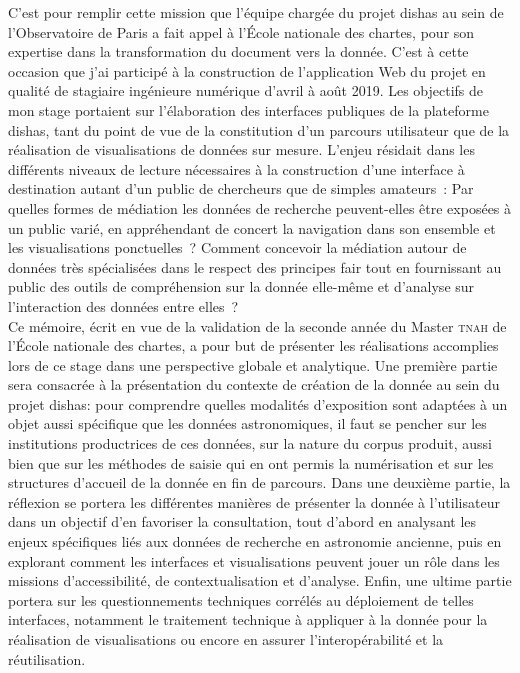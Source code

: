 \documentclass[a4paper,12pt,twoside]{book}
\newcommand{\enc}{École nationale des chartes\xspace}
\newcommand{\tnah}{\textsc{tnah}\xspace}
\newcommand{\dishas}{\gls{dishas}\xspace}
\newcommand{\fair}{\gls{fair}\xspace}
\begin{document}
C'est pour remplir cette mission que l'équipe chargée du projet \dishas au sein de l'Observatoire de Paris a fait appel à l'\enc, pour son expertise dans la transformation du document vers la donnée. C'est à cette occasion que j'ai participé à la construction de l'application Web du projet en qualité de stagiaire ingénieure numérique d’avril à août 2019. Les objectifs de mon stage portaient sur l'élaboration des interfaces publiques de la plateforme \dishas, tant du point de vue de la constitution d'un parcours utilisateur que de la réalisation de visualisations de données sur mesure. L'enjeu résidait dans les différents niveaux de lecture nécessaires à la construction d'une interface à destination autant d'un public de chercheurs que de simples amateurs~: Par quelles formes de médiation les données de recherche peuvent-elles être exposées à un public varié, en appréhendant de concert la navigation dans son ensemble et les visualisations ponctuelles~? Comment concevoir la médiation autour de données très spécialisées dans le respect des principes \fair tout en fournissant au public des outils de compréhension sur la donnée elle-même et d'analyse sur l'interaction des données entre elles~?\\

Ce mémoire, écrit en vue de la validation de la seconde année du Master \tnah de l’\enc, a pour but de présenter les réalisations accomplies lors de ce stage dans une perspective globale et analytique. Une première partie sera consacrée à la présentation du contexte de création de la donnée au sein du projet \dishas: pour comprendre quelles modalités d'exposition sont adaptées à un objet aussi spécifique que les données astronomiques, il faut se pencher sur les institutions productrices de ces données, sur la nature du corpus produit, aussi bien que sur les méthodes de saisie qui en ont permis la numérisation et sur les structures d'accueil de la donnée en fin de parcours. Dans une deuxième partie, la réflexion se portera les différentes manières de présenter la donnée à l'utilisateur dans un objectif d'en favoriser la consultation, tout d'abord en analysant les enjeux spécifiques liés aux données de recherche en astronomie ancienne, puis en explorant comment les interfaces et visualisations peuvent jouer un rôle dans les missions d'accessibilité, de contextualisation et d'analyse. Enfin, une ultime partie portera sur les questionnements techniques corrélés au déploiement de telles interfaces, notamment le traitement technique à appliquer à la donnée pour la réalisation de visualisations ou encore en assurer l'interopérabilité et la réutilisation.\\
	
\end{document}
